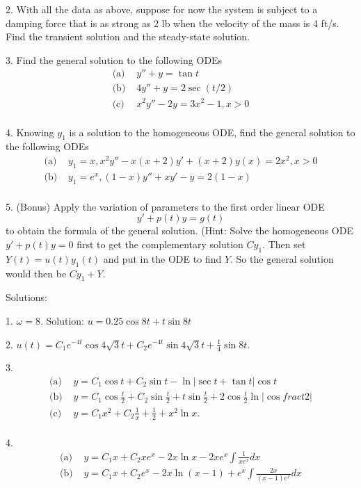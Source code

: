 \documentclass[11pt]{article}
\begin{document}
2. With all the data as above, suppose for now the system is subject to a damping force that is as strong as 2 lb when the velocity of the mass is 4 ft/s. Find the transient solution and the steady-state solution. 

3. Find the general solution to the following ODEs
$$
\begin{aligned}
\text{(a)  } & y'' + y = \tan t\\
\text{(b)  } & 4y'' + y = 2 \sec(t/2)\\
\text{(c)  } & x^2 y'' - 2y = 3x^2 - 1, x>0\\
\end{aligned}
$$

4. Knowing $y_1$ is a solution to the homogeneous ODE, find the general solution to the following ODEs
$$
\begin{aligned}
\text{(a)  } & y_1 = x, x^2 y'' - x(x+2)y' + (x+2) y(x) = 2x^2, x>0\\
\text{(b)  } & y_1 = e^x, (1-x)y'' + xy' - y = 2(1-x)\\
\end{aligned}
$$

5. (Bonus) Apply the variation of parameters to the first order linear ODE
$$y' + p(t) y = g(t)$$
to obtain the formula of the general solution. 
(Hint: Solve the homogeneous ODE $y' + p(t)y = 0$ first to get the complementary solution $Cy_1$. Then set $Y(t)=u(t)y_1(t)$ and put in the ODE to find $Y$. So the general solution would then be $Cy_1 + Y$. 

Solutions:

1. $\omega = 8$. Solution: $u = 0.25 \cos 8t + t \sin 8t$

2. $u(t) = C_1 e^{-4t}\cos 4\sqrt 3 t + C_2 e^{-4t} \sin 4\sqrt 3 t + \frac 1 4 \sin 8t$. 

3. 
$$
\begin{aligned}
\text{(a)  } & y = C_1 \cos t + C_2 \sin t - \ln|\sec t + \tan t| \cos t\\
\text{(b)  } & y = C_1 \cos \frac t 2 + C_2 \sin \frac t 2 + t\sin \frac t 2 + 2\cos \frac t 2 \ln|\cos frac t 2|\\
\text{(c)  } & y = C_1 x^2 + C_2 \frac 1 x + \frac 1 2 + x^2 \ln x. \\
\end{aligned}
$$

4. 
$$
\begin{aligned}
\text{(a)  } & y = C_1 x + C_2 xe^x - 2x\ln x - 2xe^{x} \int \frac 1 {xe^x}dx\\
\text{(b)  } & y = C_1 x + C_2 e^x - 2x \ln(x-1) + e^x \int \frac{2x}{(x-1)e^x}dx \\
\end{aligned}
$$
\newpage 
\end{document}

